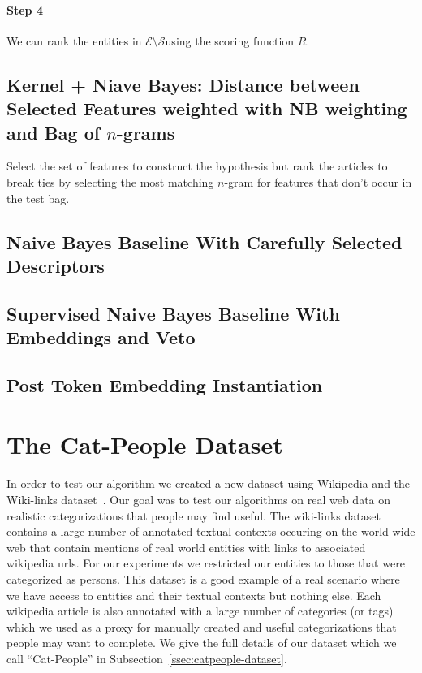 \documentclass{article}
\newcommand{\ssecref}[1]{Subsection~\ref{#1}}
\newcommand{\ems}{$\mathcal{E} \setminus \mathcal{S}$}
\begin{document}
\paragraph{Step 4}
We can rank the entities in \ems using the scoring function $R$.

\subsection{Kernel + Niave Bayes: Distance between Selected Features weighted
  with NB weighting and Bag of $n$-grams}
\label{sec:kernel-nb}
Select the set of features to construct the hypothesis but rank the articles to
break ties by selecting the most matching $n$-gram for features that don't occur
in the test bag.

\subsection{Naive Bayes Baseline With Carefully Selected Descriptors}
\label{ssec:baseline-wsim}


\subsection{Supervised Naive Bayes Baseline With Embeddings and Veto}
\label{ssec:baseline-wsim-veto}

\subsection{Post Token Embedding Instantiation}
\label{ssec:method-tokenemb}

\section{The Cat-People Dataset}
\label{sec:cat-people-dataset}
In order to test our algorithm we created a new dataset using Wikipedia and the
Wiki-links dataset~\cite{singh2012wikilinks}. Our goal was to test our
algorithms on real web data on realistic categorizations that people may find
useful. The wiki-links dataset contains a large number of annotated textual contexts
occuring on the world wide web that contain mentions of real world entities with
links to associated wikipedia urls. For our experiments we restricted our
entities to those that were categorized as persons. This dataset is a good example of a real
scenario where we have access to entities and their textual contexts but nothing
else. Each wikipedia article is also annotated with a large number of categories (or
tags) which we used as a proxy for manually created and useful categorizations
that people may want to complete. We give the full details of our dataset which
we call ``Cat-People'' in \ssecref{ssec:catpeople-dataset}.
\end{document}
